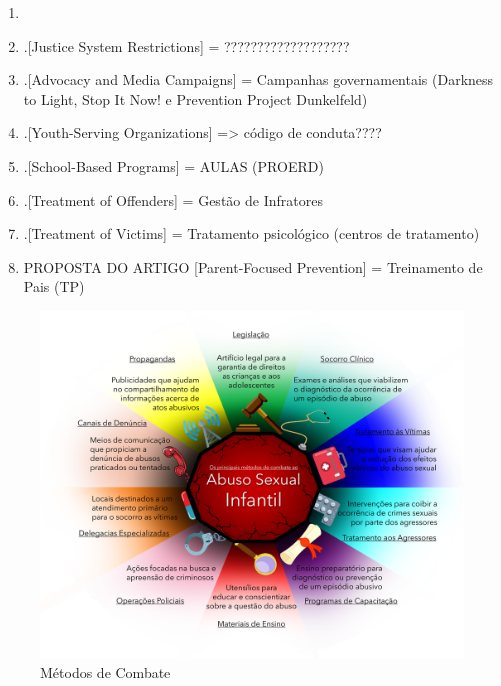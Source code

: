 
\begin{enumerate}
  \item \cite{mendelson2015parent}

  \item .[Justice System Restrictions] = ???????????????????

  \item .[Advocacy and Media Campaigns] = Campanhas governamentais (Darkness to Light, Stop It Now! e Prevention Project Dunkelfeld)

  \item .[Youth-Serving Organizations] => código de conduta????

  \item .[School-Based Programs] = AULAS (PROERD)

  \item .[Treatment of Offenders] = Gestão de Infratores

  \item .[Treatment of Victims] = Tratamento psicológico (centros de tratamento)
  
  \item PROPOSTA DO ARTIGO [Parent-Focused Prevention] = Treinamento de Pais (TP)
\end{enumerate}


\begin{figure}[htb]

	\caption{\label{fig:Riscos}Métodos de Combate}
  \begin{center}
    \includegraphics[width=\linewidth]{./Figuras/MétodosCombate.pdf}
	\end{center}

\end{figure}

